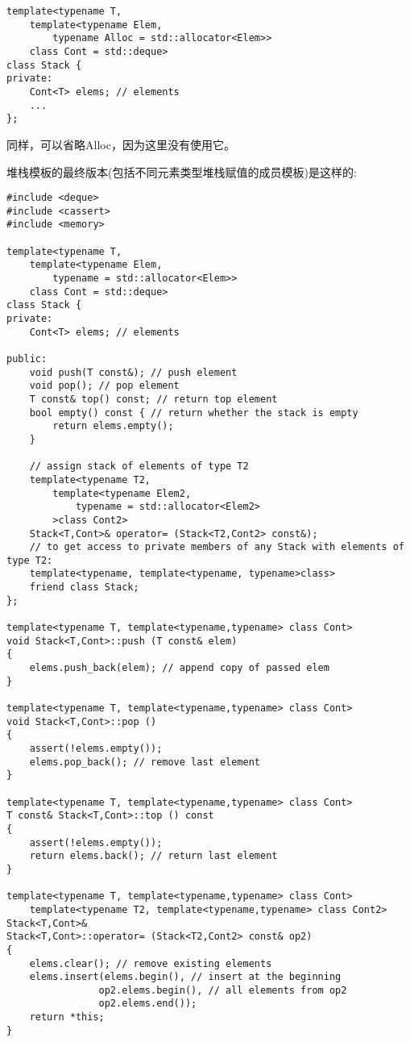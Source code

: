 \begin{lstlisting}[style=styleCXX]
template<typename T,
	template<typename Elem,
		typename Alloc = std::allocator<Elem>>
	class Cont = std::deque>
class Stack {
private:
	Cont<T> elems; // elements
	...
};
\end{lstlisting}

同样，可以省略Alloc，因为这里没有使用它。

堆栈模板的最终版本(包括不同元素类型堆栈赋值的成员模板)是这样的:

\begin{lstlisting}[style=styleCXX]
#include <deque>
#include <cassert>
#include <memory>

template<typename T,
	template<typename Elem,
		typename = std::allocator<Elem>>
	class Cont = std::deque>
class Stack {
private:
	Cont<T> elems; // elements
	
public:
	void push(T const&); // push element
	void pop(); // pop element
	T const& top() const; // return top element
	bool empty() const { // return whether the stack is empty
		return elems.empty();
	}

	// assign stack of elements of type T2
	template<typename T2,
		template<typename Elem2,
			typename = std::allocator<Elem2>
		>class Cont2>
	Stack<T,Cont>& operator= (Stack<T2,Cont2> const&);
	// to get access to private members of any Stack with elements of type T2:
	template<typename, template<typename, typename>class>
	friend class Stack;
};

template<typename T, template<typename,typename> class Cont>
void Stack<T,Cont>::push (T const& elem)
{
	elems.push_back(elem); // append copy of passed elem
}

template<typename T, template<typename,typename> class Cont>
void Stack<T,Cont>::pop ()
{
	assert(!elems.empty());
	elems.pop_back(); // remove last element
}

template<typename T, template<typename,typename> class Cont>
T const& Stack<T,Cont>::top () const
{
	assert(!elems.empty());
	return elems.back(); // return last element
}

template<typename T, template<typename,typename> class Cont>
	template<typename T2, template<typename,typename> class Cont2>
Stack<T,Cont>&
Stack<T,Cont>::operator= (Stack<T2,Cont2> const& op2)
{
	elems.clear(); // remove existing elements
	elems.insert(elems.begin(), // insert at the beginning
				op2.elems.begin(), // all elements from op2
				op2.elems.end());
	return *this;
}
\end{lstlisting}

